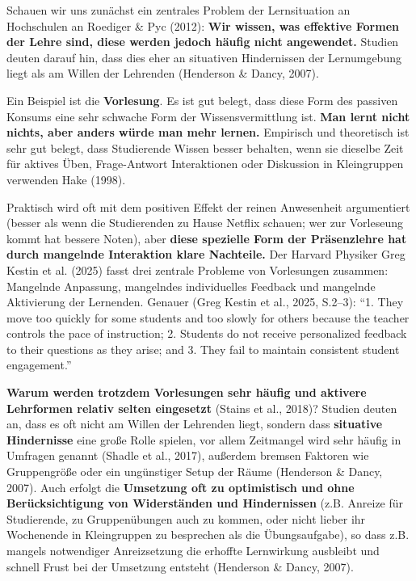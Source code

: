 \documentclass[
  ngerman,
  letterpaper,
  DIV=11]{scrreprt}
\begin{document}
Schauen wir uns zunächst ein zentrales Problem der Lernsituation an
Hochschulen an Roediger \& Pyc (2012): \textbf{Wir wissen, was effektive
Formen der Lehre sind, diese werden jedoch häufig nicht angewendet.}
Studien deuten darauf hin, dass dies eher an situativen Hindernissen der
Lernumgebung liegt als am Willen der Lehrenden (Henderson \& Dancy,
2007).

Ein Beispiel ist die \textbf{Vorlesung}. Es ist gut belegt, dass diese
Form des passiven Konsums eine sehr schwache Form der Wissensvermittlung
ist. \textbf{Man lernt nicht nichts, aber anders würde man mehr lernen.}
Empirisch und theoretisch ist sehr gut belegt, dass Studierende Wissen
besser behalten, wenn sie dieselbe Zeit für aktives Üben, Frage-Antwort
Interaktionen oder Diskussion in Kleingruppen verwenden Hake (1998).

Praktisch wird oft mit dem positiven Effekt der reinen Anwesenheit
argumentiert (besser als wenn die Studierenden zu Hause Netflix schauen;
wer zur Vorleseung kommt hat bessere Noten), aber \textbf{diese
spezielle Form der Präsenzlehre hat durch mangelnde Interaktion klare
Nachteile.} Der Harvard Physiker Greg Kestin et al. (2025) fasst drei
zentrale Probleme von Vorlesungen zusammen: Mangelnde Anpassung,
mangelndes individuelles Feedback und mangelnde Aktivierung der
Lernenden. Genauer (Greg Kestin et al., 2025, S.2--3): ``1. They move
too quickly for some students and too slowly for others because the
teacher controls the pace of instruction; 2. Students do not receive
personalized feedback to their questions as they arise; and 3. They fail
to maintain consistent student engagement.''

\textbf{Warum werden trotzdem Vorlesungen sehr häufig und aktivere
Lehrformen relativ selten eingesetzt} (Stains et al., 2018)? Studien
deuten an, dass es oft nicht am Willen der Lehrenden liegt, sondern dass
\textbf{situative Hindernisse} eine große Rolle spielen, vor allem
Zeitmangel wird sehr häufig in Umfragen genannt (Shadle et al., 2017),
außerdem bremsen Faktoren wie Gruppengröße oder ein ungünstiger Setup
der Räume (Henderson \& Dancy, 2007). Auch erfolgt die \textbf{Umsetzung
oft zu optimistisch und ohne Berücksichtigung von Widerständen und
Hindernissen} (z.B. Anreize für Studierende, zu Gruppenübungen auch zu
kommen, oder nicht lieber ihr Wochenende in Kleingruppen zu besprechen
als die Übungsaufgabe), so dass z.B. mangels notwendiger Anreizsetzung
die erhoffte Lernwirkung ausbleibt und schnell Frust bei der Umsetzung
entsteht (Henderson \& Dancy, 2007).
\end{document}
